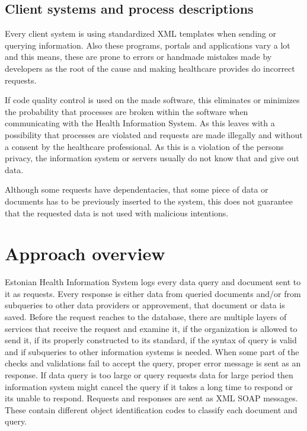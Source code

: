 \documentclass[a4paper, 12pt]{article}
\let\stdsection\section
\renewcommand\section{\newpage\stdsection}
\begin{document}
\subsection{Client systems and process descriptions}
Every client system is using standardized XML templates when sending or querying information. Also these programs, portals and applications vary a lot and this means, these are prone to errors or handmade mistakes made by developers as the root of the cause and making healthcare provides do incorrect requests. 

If code quality control is used on the made software, this eliminates or minimizes the probability that processes are broken within the software when communicating with the Health Information System. As this leaves with a possibility that processes are violated and requests are made illegally and without a consent by the healthcare professional. As this is a violation of the persons privacy, the information system or servers usually do not know that and give out data. 

Although some requests have dependentacies, that some piece of data or documents has to be previously inserted to the system, this does not guarantee that the requested data is not used with malicious intentions. 



\section{Approach overview}
Estonian Health Information System logs every data query and document sent to it as requests. Every response is either data from queried documents and/or from subqueries to other data providers or approvement, that document or data is saved. 
Before the request reaches to the database, there are multiple layers of services that receive the request and examine it, if the organization is allowed to send it, if its properly constructed to its standard, if the syntax of query is valid and if subqueries to other information systems is needed. When some part of the checks and validations fail to accept the query, proper error message is sent as an response. If data query is too large or query requests data for large period then information system might cancel the query if it takes a long time to respond or its unable to respond. 
Requests and responses are sent as XML SOAP messages. These contain different object identification codes to classify each document and query. 
\end{document}
